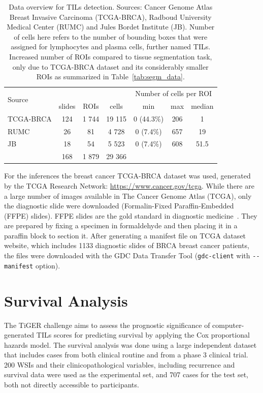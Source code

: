 \begin{table}[h!]
\centering
\begin{tabular}{ l c c c c c c } 
\hline
\multirow{2}{*}{Source} & & & & \multicolumn{3}{c}{Number of cells per ROI}\\ 
\cline{2-7}
 & slides & ROIs & cells & min & max & median \\ 
\hline
TCGA-BRCA & 124 & 1 744 & 19 115 & 0 (44.3\%) & 206 & 1\\ 
RUMC & 26 & 81 & 4 728 & 0 (7.4\%) & 657 & 19\\ 
JB & 18 & 54 & 5 523 & 0 (7.4\%) & 608 & 51.5\\
\hline
 & 168 & 1 879 & 29 366 & & &\\
\end{tabular}
\caption{\label{tab:tils_data} Data overview for TILs detection. Sources: Cancer Genome Atlas Breast Invasive Carcinoma (TCGA-BRCA),
Radboud University Medical Center (RUMC) and Jules Bordet Institute (JB). Number of cells here refers to the number of
bounding boxes that were assigned for lymphocytes and plasma cells, further named TILs.
Increased number of ROIs compared to tissue segmentation task, only due to TCGA-BRCA dataset and its considerably smaller ROIs as summarized in Table~\ref{tab:segm_data}.}
\end{table}

For the inferences the breast cancer TCGA-BRCA dataset was used, generated by
the TCGA Research Network: \hyperlink{https://www.cancer.gov/tcga}{https://www.cancer.gov/tcga}.
While there are a large number of images available in The Cancer Genome Atlas (TCGA),
only the diagnostic slide were downloaded (Formalin-Fixed Paraffin-Embedded (FFPE) slides).
FFPE slides are the gold standard in diagnostic medicine~\cite{smith_2014}.
They are prepared by fixing a specimen in formaldehyde and then placing it in a
paraffin block to section it. 
After generating a manifest file on TCGA dataset website, which includes 1133 diagnostic slides
of BRCA breast cancer patients, the files were downloaded with the GDC Data Transfer Tool
(\verb+gdc-client+ with \verb+--manifest+ option). 


\section{Survival Analysis}
The TiGER challenge aims to assess the prognostic significance of computer-generated TILs scores for predicting survival by applying the Cox proportional hazards model. The survival analysis was done using a large independent dataset that includes cases from both clinical routine and from a phase 3 clinical trial.
200 WSIs and their clinicopathological variables, including recurrence and survival data were used as the experimental set, and 707 cases for the test set, both not directly accessible to participants.

